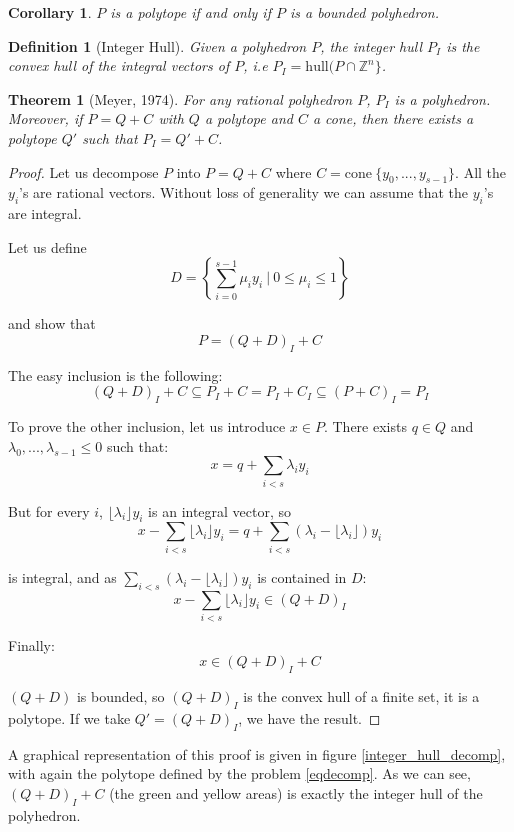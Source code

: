 \documentclass{article}
\newcommand{\cone}{\mathrm{cone}}
\newcommand{\hull}{\mathrm{hull}}
\newcommand{\ints}{\mathbb{Z}}
\newcommand{\ifff}{if and only if}
\newtheorem{definition}{Definition}
\newtheorem{theorem}{Theorem}
\newtheorem{corollary}{Corollary}
\begin{document}
\begin{corollary}
  $P$ is a polytope \ifff{} $P$ is a bounded polyhedron.
\end{corollary}

\begin{definition}[Integer Hull]
  Given a polyhedron $P$, the \textup{integer hull} $P_I$ is the convex hull of
  the integral vectors of $P$, i.e $P_I = \hull (P \cap \ints^n\}$.
\end{definition}

\begin{theorem}[Meyer, 1974]
\label{meyer theorem}
  For any rational polyhedron $P$, $P_I$ is a polyhedron. Moreover, if
  $P = Q + C$ with $Q$ a polytope and $C$ a cone, then there exists a polytope
  $Q'$ such that $P_I = Q' + C$.
\end{theorem}
\begin{proof}
  Let us decompose $P$ into $P = Q + C$ where
  $C = \cone~\{y_0, ..., y_{s-1}\}$. All the $y_i$'s are rational vectors.
  Without loss of generality we can assume that the $y_i$'s are integral.

  Let us define
  $$D = \left\{\sum_{i=0}^{s-1} \mu_i y_i~|~
               0 \leqslant \mu_i \leqslant 1\right\}$$

  and show that $$P = (Q + D)_I + C$$

  The easy inclusion is the following:
  $$(Q + D)_I + C \subseteq P_I + C = P_I + C_I \subseteq (P + C)_I = P_I$$

  To prove the other inclusion, let us introduce $x \in P$.
  There exists $q \in Q$ and $\lambda_0, ..., \lambda_{s-1}
  \leqslant 0$ such that: $$x = q + \sum_{i < s} \lambda_i y_i$$
  
  But for every
  $i$, $\lfloor \lambda_i \rfloor y_i$ is an integral vector, so
  $$x - \sum_{i<s} \lfloor \lambda_i \rfloor y_i=
      q + \sum_{i<s} (\lambda_i - \lfloor \lambda_i \rfloor) y_i$$

  is integral, and as $\sum_{i<s} (\lambda_i - \lfloor \lambda_i \rfloor) y_i$
  is contained in $D$:
  $$x - \sum_{i<s} \lfloor \lambda_i \rfloor y_i \in (Q + D)_I$$

  Finally: $$x \in (Q + D)_I + C$$

  $(Q + D)$ is bounded, so $(Q + D)_I$ is the convex hull of a finite set, it is
  a polytope. If we take $Q' = (Q + D)_I$, we have the result.
\end{proof}

A graphical representation of this proof is given in figure
\ref{integer_hull_decomp}, with again the polytope defined by the problem
\ref{eqdecomp}. As we can see, $(Q + D)_I + C$ (the
green and yellow areas) is exactly the integer hull of the polyhedron.
\end{document}
